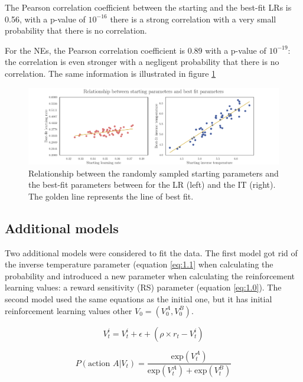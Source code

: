 \documentclass[12pt]{article}
\begin{document}
The Pearson correlation coefficient between the starting and the best-fit LRs is 0.56, with a p-value of $10^{-16}$ there is a strong correlation with a very small probability that there is no correlation.

For the NEs, the Pearson correlation coefficient is 0.89 with a p-value of $10^{-19}$: the correlation is even stronger with a negligent probability that there is no correlation. The same information is illustrated in figure \ref{fig:2.5.1}

\begin{figure}[h!]
	\centering
	\hspace*{-0.6in}
	\includegraphics[width=1.15\linewidth]{figures/2.5.1.pdf}
	\caption{Relationship between the randomly sampled starting parameters and the best-fit parameters between for the LR (left) and the IT (right). The golden line represents the line of best fit.}
	\label{fig:2.5.1}
\end{figure}

\subsection{Additional models}

Two additional models were considered to fit the data. The first model got rid of the inverse temperature parameter (equation \ref{eq:1.1} when calculating the probability and introduced a new parameter when calculating the reinforcement learning values: a reward sensitivity (RS) parameter (equation \ref{eq:1.0}). The second model used the same equations as the initial one, but it has initial reinforcement learning values other $V_0 = (V^A_0, V^B_0)$. 

\begin{equation}
    V_t^i = V_t^i + \epsilon + (\rho \times r_t - V_t^i)
    \label{eq:1.0}
\end{equation}

\begin{equation}
    P(\text{action } A | V_t) = \frac{\mathrm{exp}(V_t^A)}{\mathrm{exp}(V_t^A) + \mathrm{exp}(V_t^B)}
    \label{eq:1.1}
\end{equation}
\end{document}
